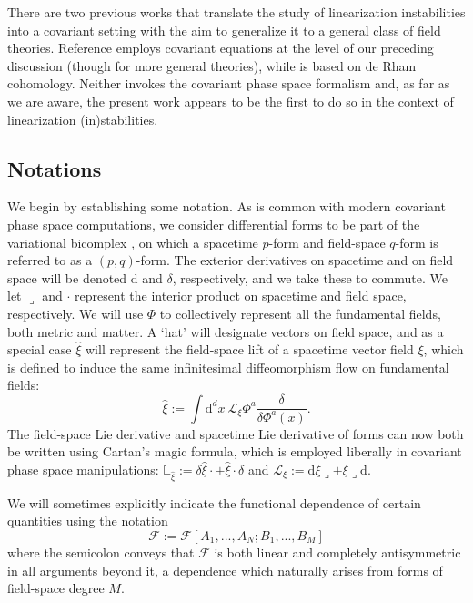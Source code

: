 \documentclass[]{jkpaper}
\theoremstyle{plain}
\theoremstyle{definition}
\newcommand{\sins}{\mathop{\lrcorner}}
\newcommand{\fins}{\cdot}
\newcommand{\sd}{\mathrm {d}}
\def\extd{\mathrm {d}}
\newcommand{\fd}{\delta}
\newcommand{\sL}{\mathcal{L}}
\newcommand{\fL}{\mathbb{L}}
\begin{document}
There are two previous works that translate the study of linearization instabilities into a covariant setting with the aim to generalize it to a general class of field theories. Reference \cite{Arms:1986vk} employs covariant equations at the level of our preceding discussion (though for more general theories), while \cite{Khavkine:2013iei} is based on de Rham cohomology. Neither invokes the covariant phase space formalism and, as far as we are aware, the present work appears to be the first to do so in the context of linearization (in)stabilities.




\subsection{Notations}
\label{subsec: notations}
We begin by establishing some notation.  As is common with modern covariant phase space computations, we consider differential forms to be part of the variational bicomplex \cite{anderson1992introduction}, on which a spacetime $p$-form and field-space $q$-form is referred to as a $(p,q)$-form.  The exterior derivatives on spacetime and on field space will be denoted $\sd$ and $\fd$, respectively, and we take these to commute.  We let $\sins$ and $\fins$ represent the interior product on spacetime and field space, respectively.  We will use $\Phi$ to collectively represent all the fundamental fields, both metric and matter.  A `hat' will designate vectors on field space, and as a special case $\hat{\xi}$ will represent the field-space lift of a spacetime vector field $\xi$, which is defined to induce the same infinitesimal diffeomorphism flow on fundamental fields:
\begin{equation}
    \hat{\xi}:=
    \int \extd^d x~ \sL_{\xi}\Phi^a\frac{\delta}{\delta \Phi^a(x)}.
\end{equation} 
The field-space Lie derivative and spacetime Lie derivative of forms can now both be written using Cartan's magic formula, which is employed liberally in covariant phase space manipulations: $\fL_{\hat{\xi}}:=\fd \hat{\xi}\fins+\hat{\xi}\fins \fd$ and $\sL_{\xi}:= \sd \xi\sins+\xi\sins \sd$.

We will sometimes explicitly indicate the functional dependence of certain quantities using the notation
\begin{equation}\label{eq: functional dependence notation}
    \mathcal{F}:=\mathcal{F}\left[A_1,...,A_N; B_1,...,B_M\right]
\end{equation}
where the semicolon conveys that $\mathcal{F}$ is both linear and completely antisymmetric in all arguments beyond it, a dependence which naturally arises from forms of field-space degree $M$. 
\end{document}
